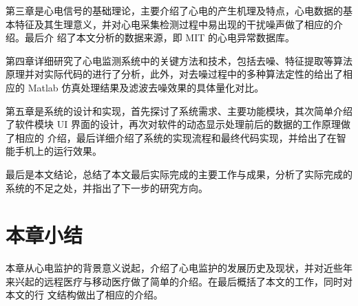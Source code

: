 第三章是心电信号的基础理论，主要介绍了心电的产生机理及特点，心电数据的基本特征及其生理意义，并对心电采集检测过程中易出现的干扰噪声做了相应的介绍。最后介
绍了本文分析的数据来源，即 MIT 的心电异常数据库。

第四章详细研究了心电监测系统中的关键方法和技术，包括去噪、特征提取等算法原理并对实际代码的进行了分析，此外，对去噪过程中的多种算法定性的给出了相应的
Matlab 仿真处理结果及滤波去噪效果的具体量化对比。

第五章是系统的设计和实现，首先探讨了系统需求、主要功能模块，其次简单介绍了软件模块 UI 界面的设计，再次对软件的动态显示处理前后的数据的工作原理做了相应的
介绍，最后详细介绍了系统的实现流程和最终代码实现，并给出了在智能手机上的运行效果。

最后是本文结论，总结了本文最后实际完成的主要工作与成果，分析了实际完成的系统的不足之处，并指出了下一步的研究方向。

\section{本章小结}
本章从心电监护的背景意义说起，介绍了心电监护的发展历史及现状，并对近些年来兴起的远程医疗与移动医疗做了简单的介绍。在最后概括了本文的工作，同时对本文的行
文结构做出了相应的介绍。
